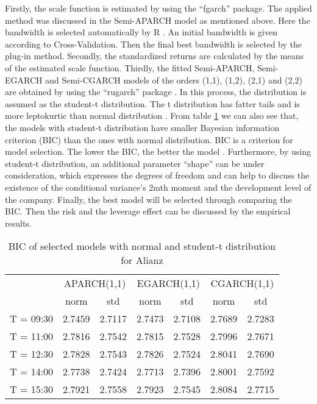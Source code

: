 Firstly, the scale function is estimated by using the ``fgarch'' package. The applied method was discussed in the Semi-APARCH model as mentioned above. Here the bandwidth is selected automatically by R \citep{Wuertz2013}. An initial bandwidth is given according to Cross-Validation. Then the final best bandwidth is selected by the plug-in method. Secondly, the standardized returns are calculated by the means of the estimated scale function. Thirdly, the fitted Semi-APARCH, Semi-EGARCH and Semi-CGARCH models of the orders (1,1), (1,2), (2,1) and (2,2) are obtained by using the ``rugarch'' package
 \citep{Ghalanos2014a}. In this process, the distribution is assumed as the student-t distribution. The t distribution has fatter tails and is more leptokurtic than normal distribution \citep{Pollard1998}. From table \ref{tab:table-stu-alc} we can also see that, the models with student-t distribution have smaller Bayesian information criterion (BIC) than the ones with normal distribution. BIC is a criterion for model selection. The lower the BIC, the better the model \citep{Schwarz1978}. Furthermore, by using student-t distribution, an additional parameter ``shape'' can be under consideration, which expresses the degrees of freedom and can help to discuss the existence of the conditional variance's 2mth moment and the development level of the company. Finally, the best model will be selected through comparing the BIC. Then the risk and the leverage effect can be discussed by the empirical results.

\begin{table}[!h]
  \small
  \centering
  \vspace{2ex}
\begin{tabular}{c|cc|cc|cc}
\toprule
\multirow{2}{*}{} &
\multicolumn{2}{c|}{APARCH(1,1)} &
\multicolumn{2}{c|}{EGARCH(1,1)} &
\multicolumn{2}{c}{CGARCH(1,1)} \\
\cline{1-3}\cline{4-5}\cline{6-7}
& norm  & std & norm  & std & norm   & std  \\
\midrule
\hline
T = 09:30  & 2.7459 & 2.7117 & 2.7473 & 2.7108 & 2.7689 & 2.7283 \\

T = 11:00  & 2.7816 & 2.7542 & 2.7815 & 2.7528 & 2.7996 & 2.7671 \\

T = 12:30  & 2.7828 & 2.7543 & 2.7826 & 2.7524 & 2.8041 & 2.7690 \\

T = 14:00  & 2.7738 & 2.7424 & 2.7713 & 2.7396 & 2.8001 & 2.7592 \\

T = 15:30  & 2.7921 & 2.7558 & 2.7923 & 2.7545 & 2.8084 & 2.7715 \\

\bottomrule


\end{tabular}

  \caption{BIC of selected models with normal and student-t distribution for Alianz}
  \label{tab:table-stu-alc}
  
\end{table}

